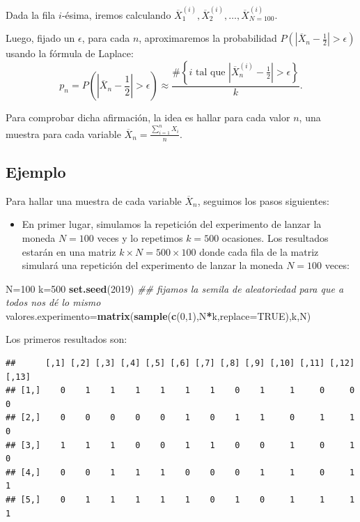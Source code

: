\documentclass[]{book}
\newenvironment{Shaded}{\begin{snugshade}}{\end{snugshade}}
\newcommand{\CommentTok}[1]{\textcolor[rgb]{0.56,0.35,0.01}{\textit{#1}}}
\newcommand{\DataTypeTok}[1]{\textcolor[rgb]{0.13,0.29,0.53}{#1}}
\newcommand{\DecValTok}[1]{\textcolor[rgb]{0.00,0.00,0.81}{#1}}
\newcommand{\KeywordTok}[1]{\textcolor[rgb]{0.13,0.29,0.53}{\textbf{#1}}}
\newcommand{\NormalTok}[1]{#1}
\newcommand{\OperatorTok}[1]{\textcolor[rgb]{0.81,0.36,0.00}{\textbf{#1}}}
\newcommand{\OtherTok}[1]{\textcolor[rgb]{0.56,0.35,0.01}{#1}}
\providecommand{\tightlist}{%
  \setlength{\itemsep}{0pt}\setlength{\parskip}{0pt}}
\begin{document}
Dada la fila \(i\)-ésima, iremos calculando \(\overline{X}_1^{(i)},\overline{X}_2^{(i)},\ldots,\overline{X}_{N=100}^{(i)}\).

Luego, fijado un \(\epsilon\), para cada \(n\), aproximaremos la probabilidad \(P\left(\left|\overline{X}_n-\frac{1}{2}\right|>\epsilon\right)\) usando la fórmula de Laplace:
\[
p_n=P\left(\left|\overline{X}_n-\frac{1}{2}\right|>\epsilon\right) \approx\frac{\#\left\{\mbox{$i$ tal que  $\left|\overline{X}_n^{(i)}-\frac{1}{2}\right|>\epsilon$}\right\}}{k}.
\]

Para comprobar dicha afirmación, la idea es hallar para cada valor \(n\), una muestra para cada variable \(\overline{X}_n=\frac{\sum\limits_{i=1}^n X_i}{n}\).

\hypertarget{ejemplo-144}{%
\subsection{Ejemplo}\label{ejemplo-144}}

Para hallar una muestra de cada variable \(\overline{X}_n\), seguimos los pasos siguientes:

\begin{itemize}
\tightlist
\item
  En primer lugar, simulamos la repetición del experimento de lanzar la moneda \(N=100\) veces y lo repetimos \(k=500\) ocasiones.
  Los resultados estarán en una matriz \(k\times N =500\times 100\) donde cada fila de la matriz simulará una repetición del experimento de lanzar la moneda \(N=100\) veces:
\end{itemize}

\begin{Shaded}
\begin{Highlighting}[]
\NormalTok{N=}\DecValTok{100}
\NormalTok{k=}\DecValTok{500}
\KeywordTok{set.seed}\NormalTok{(}\DecValTok{2019}\NormalTok{) }\CommentTok{## fijamos la semila de aleatoriedad para que a todos nos dé lo mismo}
\NormalTok{valores.experimento=}\KeywordTok{matrix}\NormalTok{(}\KeywordTok{sample}\NormalTok{(}\KeywordTok{c}\NormalTok{(}\DecValTok{0}\NormalTok{,}\DecValTok{1}\NormalTok{),N}\OperatorTok{*}\NormalTok{k,}\DataTypeTok{replace=}\OtherTok{TRUE}\NormalTok{),k,N)}
\end{Highlighting}
\end{Shaded}

Los primeros resultados son:

\begin{verbatim}
##      [,1] [,2] [,3] [,4] [,5] [,6] [,7] [,8] [,9] [,10] [,11] [,12] [,13]
## [1,]    0    1    1    1    1    1    1    0    1     1     0     0     0
## [2,]    0    0    0    0    0    1    0    1    1     0     1     1     0
## [3,]    1    1    1    0    0    1    1    0    0     1     0     1     0
## [4,]    0    0    1    1    1    0    0    0    1     1     0     1     1
## [5,]    0    1    1    1    1    1    0    1    0     1     1     1     1
\end{verbatim}
\end{document}
